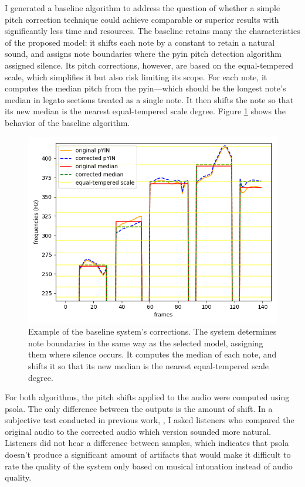 I generated a baseline algorithm to address the question of whether a simple pitch correction technique could achieve comparable or superior results with significantly less time and resources. The baseline retains many the characteristics of the proposed model: it shifts each note by a constant to retain a natural sound, and assigns note boundaries where the \gls{pyin} pitch detection algorithm assigned silence. Its pitch corrections, however, are based on the equal-tempered scale, which simplifies it but also risk limiting its scope. For each note, it computes the median pitch from the \gls{pyin}---which should be the longest note's median in legato sections treated as a single note. It then shifts the note so that its new median is the nearest equal-tempered scale degree. Figure \ref{fig:baseline_tuning} shows the behavior of the baseline algorithm.

\begin{figure}[t]
    \centering
    \includegraphics[width=\columnwidth]{figures/baseline_tuning.png}
    \caption{Example of the baseline system's corrections. The system determines note boundaries in the same way as the selected model, assigning them where silence occurs. It computes the median of each note, and shifts it so that its new median is the nearest equal-tempered scale degree.}
    \label{fig:baseline_tuning}
\end{figure}

For both algorithms, the pitch shifts applied to the audio were computed using \gls{psola}. The only difference between the outputs is the amount of shift. In a subjective test conducted in previous work, \cite{wager2020deep}, I asked listeners who compared the original audio to the corrected audio which version sounded more natural. Listeners did not hear a difference between samples, which indicates that \gls{psola} doesn't produce a significant amount of artifacts that would make it difficult to rate the quality of the system only based on musical intonation instead of audio quality.

